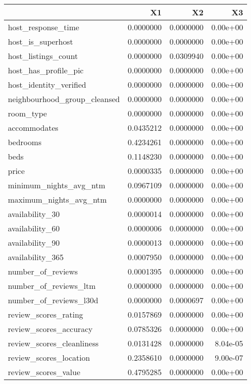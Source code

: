 
\begin{tabular}[t]{lrrr}
\toprule
  & X1 & X2 & X3\\
\midrule
host\_response\_time & 0.0000000 & 0.0000000 & 0.00e+00\\
host\_is\_superhost & 0.0000000 & 0.0000000 & 0.00e+00\\
host\_listings\_count & 0.0000000 & 0.0309940 & 0.00e+00\\
host\_has\_profile\_pic & 0.0000000 & 0.0000000 & 0.00e+00\\
host\_identity\_verified & 0.0000000 & 0.0000000 & 0.00e+00\\
\addlinespace
neighbourhood\_group\_cleansed & 0.0000000 & 0.0000000 & 0.00e+00\\
room\_type & 0.0000000 & 0.0000000 & 0.00e+00\\
accommodates & 0.0435212 & 0.0000000 & 0.00e+00\\
bedrooms & 0.4234261 & 0.0000000 & 0.00e+00\\
beds & 0.1148230 & 0.0000000 & 0.00e+00\\
\addlinespace
price & 0.0000335 & 0.0000000 & 0.00e+00\\
minimum\_nights\_avg\_ntm & 0.0967109 & 0.0000000 & 0.00e+00\\
maximum\_nights\_avg\_ntm & 0.0000000 & 0.0000000 & 0.00e+00\\
availability\_30 & 0.0000014 & 0.0000000 & 0.00e+00\\
availability\_60 & 0.0000006 & 0.0000000 & 0.00e+00\\
\addlinespace
availability\_90 & 0.0000013 & 0.0000000 & 0.00e+00\\
availability\_365 & 0.0007950 & 0.0000000 & 0.00e+00\\
number\_of\_reviews & 0.0001395 & 0.0000000 & 0.00e+00\\
number\_of\_reviews\_ltm & 0.0000000 & 0.0000000 & 0.00e+00\\
number\_of\_reviews\_l30d & 0.0000000 & 0.0000697 & 0.00e+00\\
\addlinespace
review\_scores\_rating & 0.0157869 & 0.0000000 & 0.00e+00\\
review\_scores\_accuracy & 0.0785326 & 0.0000000 & 0.00e+00\\
review\_scores\_cleanliness & 0.0131428 & 0.0000000 & 8.04e-05\\
review\_scores\_location & 0.2358610 & 0.0000000 & 9.00e-07\\
review\_scores\_value & 0.4795285 & 0.0000000 & 0.00e+00\\

\end{tabular}
